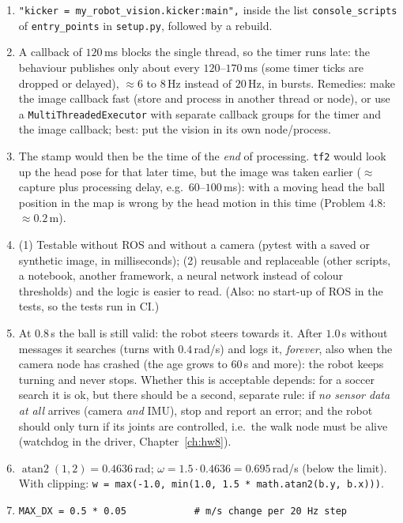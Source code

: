 \begin{enumerate}[label=\textbf{\ansnum.\arabic*}]
  \item \verb!"kicker = my_robot_vision.kicker:main",! inside the list \verb!console_scripts! of \verb!entry_points! in \verb!setup.py!, followed by a rebuild.
  \item A callback of $120$\,ms blocks the single thread, so the timer runs late: the behaviour publishes only about every $120$--$170$\,ms (some timer ticks are dropped or delayed), $\approx6$ to $8$\,Hz instead of $20$\,Hz, in bursts. Remedies: make the image callback fast (store and process in another thread or node), or use a \verb!MultiThreadedExecutor! with separate callback groups for the timer and the image callback; best: put the vision in its own node/process.
  \item The stamp would then be the time of the \emph{end} of processing. \verb!tf2! would look up the head pose for that later time, but the image was taken earlier ($\approx$ capture plus processing delay, e.g.\ $60$--$100$\,ms): with a moving head the ball position in the map is wrong by the head motion in this time (Problem 4.8: $\approx0.2$\,m).
  \item (1) Testable without ROS and without a camera (pytest with a saved or synthetic image, in milliseconds); (2) reusable and replaceable (other scripts, a notebook, another framework, a neural network instead of colour thresholds) and the logic is easier to read. (Also: no start-up of ROS in the tests, so the tests run in CI.)
  \item At $0.8$\,s the ball is still valid: the robot steers towards it. After $1.0$\,s without messages it searches (turns with $0.4$\,rad/s) and logs it, \emph{forever}, also when the camera node has crashed (the age grows to $60$\,s and more): the robot keeps turning and never stops. Whether this is acceptable depends: for a soccer search it is ok, but there should be a second, separate rule: if \emph{no sensor data at all} arrives (camera \emph{and} IMU), stop and report an error; and the robot should only turn if its joints are controlled, i.e.\ the walk node must be alive (watchdog in the driver, Chapter~\ref{ch:hw8}).
  \item $\operatorname{atan2}(1,2)=0.4636$\,rad; $\omega=1.5\cdot0.4636=0.695$\,rad/s (below the limit). With clipping: \verb!w = max(-1.0, min(1.0, 1.5 * math.atan2(b.y, b.x)))!.
  \item
\begin{verbatim}
MAX_DX = 0.5 * 0.05            # m/s change per 20 Hz step

\end{verbatim}
\end{enumerate}
